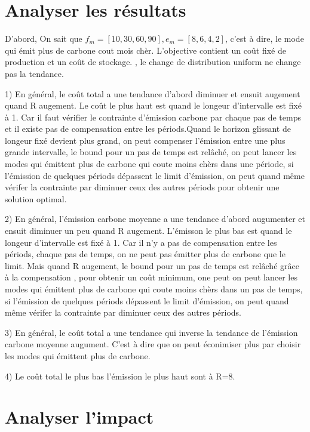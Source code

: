 \documentclass[12pt,a4paper]{article}
\begin{document}
\section{Analyser les résultats}
\begin{justify}
D'abord, On sait que $f_m=[10,30,60,90],e_m=[8,6,4,2]$, c'est à dire, le mode qui émit plus de carbone cout mois chèr. L'objective contient un coût fixé de production et un coût de stockage. , le change de distribution uniform ne change pas la tendance.

1) En général, le coût total a une tendance d'abord diminuer et ensuit augement quand R augement. Le coût le plus haut est quand le longeur d'intervalle est fixé à 1. Car il faut vérifier le contrainte d'émission carbone par chaque pas de temps et il existe pas de compensation entre les périods.Quand le horizon glissant de longeur fixé devient plus grand, on peut compenser l'émission entre une plus grande intervalle, le bound pour un pas de temps  est relâché, on peut lancer les modes qui émittent plus de carbone qui coute moins chèrs dans une période, si l'émission de quelques périods dépassent le limit d'émission, on peut quand même vérifer la contrainte par diminuer ceux des autres périods pour obtenir une solution optimal.

2) En général, l'émission carbone moyenne a une tendance d'abord augumenter et ensuit diminuer un peu quand R augement. L'émisson le plus bas est quand le longeur d'intervalle est fixé à 1. Car il n'y a pas de compensation entre les périods, chaque pas de temps, on ne peut pas émitter plus de carbone que le limit. Mais quand R augement, le bound pour un pas de temps est relâché grâce à la compensation , pour obtenir un coût minimum, one peut  on peut lancer les modes qui émittent plus de carbone qui coute moins chèrs dans un pas de temps, si l'émission de quelques périods dépassent le limit d'émission, on peut quand même vérifer la contrainte par diminuer ceux des autres périods. 

3) En général, le coût total a une tendance qui inverse la tendance de l'émission carbone moyenne augument. C'est à dire que on peut éconimiser plus par choisir les modes qui émittent plus de carbone.

4) Le coût total le plus bas l'émission le plus haut sont à R=8.

 \end{justify}
\section{Analyser l'impact}
\end{document}
